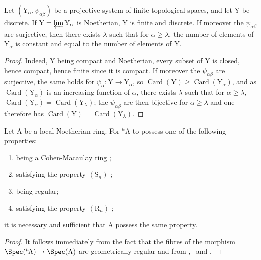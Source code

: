 \begin{lemma}[18.6.9.2]
\label{IV.18.6.9.2}
Let $(\mathrm{Y}_\alpha,\psi_{\alpha\beta})$ be a projective system of finite topological spaces, and let Y be discrete.
If $\mathrm{Y}=\varprojlim\mathrm{Y}_\alpha$ is Noetherian, Y is finite and discrete.
If moreover the $\psi_{\alpha\beta}$ are surjective, then there exists $\lambda$ such that for $\alpha\geq\lambda$, the number of elements of $\mathrm{Y}_\alpha$ is constant and equal to the number of elements of $\mathrm{Y}$.
\end{lemma}

\begin{proof}
Indeed, Y being compact and Noetherian, every subset of Y is closed, hence compact, hence finite since it is compact.
If moreover the $\psi_{\alpha\beta}$ are surjective, the same holds for $\psi_\alpha:\mathrm{Y}\to\mathrm{Y}_\alpha$, so $\operatorname{Card}(\mathrm{Y})\geq\operatorname{Card}(\mathrm{Y}_\alpha)$, and as $\operatorname{Card}(\mathrm{Y}_\alpha)$ is an increasing function of $\alpha$, there exists $\lambda$ such that for $\alpha\geq\lambda$, $\operatorname{Card}(\mathrm{Y}_\alpha)=\operatorname{Card}(\mathrm{Y}_\lambda)$;
the $\psi_{\alpha\beta}$ are then bijective for $\alpha\geq\lambda$ and one therefore has $\operatorname{Card}(\mathrm{Y})=\operatorname{Card}(\mathrm{Y}_\lambda)$.
\end{proof}

\begin{corollary}[18.6.10]
\label{IV.18.6.10}
Let $\mathrm{A}$ be a local Noetherian ring.
For ${}^h\!\mathrm{A}$ to possess one of the following properties:
\begin{enumerate}[label=\emph{\alph*)}]
  \item being a Cohen-Macaulay ring ;
  \item satisfying the property $(\mathrm{S}_n)$ ;
  \item being regular;
  \item satisfying the property $(\mathrm{R}_n)$ ;
\end{enumerate}
it is necessary and sufficient that A possess the same property.
\end{corollary}

\begin{proof}
It follows immediately from the fact that the fibres of the morphism $\Spec({}^h\!\mathrm{A})\to\Spec(\mathrm{A})$ are geometrically regular  and from ,~ and .
\end{proof}

